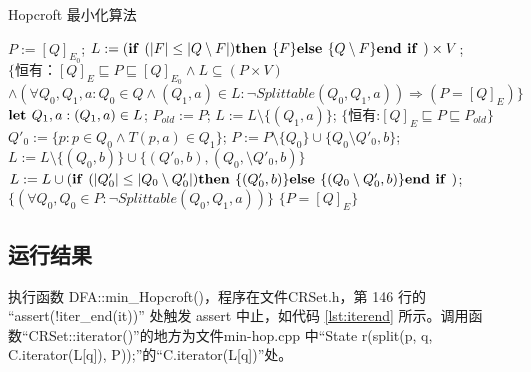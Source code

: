 \begin{algorithm}
    \caption{Hopcroft 最小化算法}\label{al:4-8}
    \small
    \begin{algorithmic}[1]
        \State $P:=[Q]_{E_0}$;
        \State $L:= ( \mbox{\textbf{if }} ( |F| \leq |Q \setminus F | ) \mbox{\textbf{then }} \{F\} \mbox{\textbf{else }} \{ Q \setminus F \} \mbox{\textbf{end if }} ) \times V $;
        \State $\{ \mbox{恒有：} [Q]_E \sqsubseteq P \sqsubseteq [Q]_{E_0} \land L \subseteq (P \times V) $
        \State \quad $ \land (\forall Q_0,Q_1,a:Q_0 \in Q \land (Q_1,a) \in L : \neg Splittable (Q_0,Q_1,a)) \Rightarrow (P=[Q]_E) \} $
            \State $ \mbox{\textbf{let }} Q_1,a:(Q_1,a) \in L $;
            \State $ P_{old} := P $;
            \State $ L := L \setminus \{ (Q_1,a) \} $;
            \State $ \{ \mbox{恒有:} [Q]_E \sqsubseteq P \sqsubseteq P_{old} \} $
                \State $ Q'_0 := \{ p:p \in Q_0 \land T(p,a) \in Q_1 \} $;
                \State $ P:= P \setminus \{ Q_0 \} \cup \{ Q_0 \setminus Q'_0,b \} $;
                       $ L := L \setminus \{ (Q_0,b) \} \cup \{ (Q'_0,b),(Q_0, \setminus Q'_0,b ) \} $
                        \State $L:= L \cup ( \mbox{\textbf{if }} ( |Q'_0| \leq |Q_0 \setminus Q'_0 | ) \mbox{\textbf{then }} \{(Q'_0,b)\} \mbox{\textbf{else }} \{ (Q_0 \setminus Q'_0,b) \} \mbox{\textbf{end if }} ) $;
                    \EndIf
                \EndFor
            \EndFor
            \State $ \{ (\forall Q_0,Q_0 \in P : \neg Splittable(Q_0,Q_1,a)) \} $
        \Until $\{ P = [Q]_E \}$
    \end{algorithmic}
\end{algorithm}


\subsection{运行结果}\label{sec:hopcroft-error}
执行函数 DFA::min\_Hopcroft()，程序在文件CRSet.h，第 146 行的 “assert(!iter\_end(it))” 处触发 assert 中止，如代码 \ref{lst:iterend} 所示。调用函数“CRSet::iterator()”的地方为文件min-hop.cpp 中“State r(split(p, q, C.iterator(L[q]), P));”的“C.iterator(L[q])”处。

